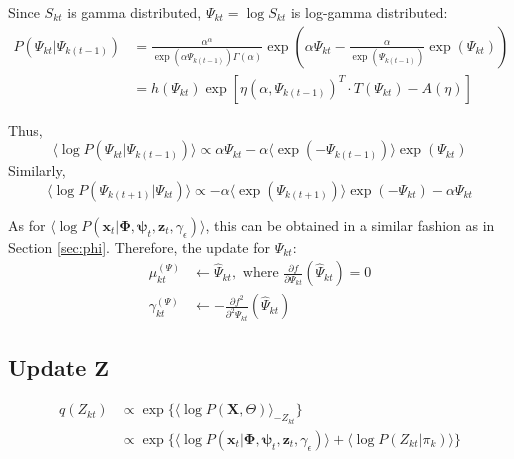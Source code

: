 \documentclass[11pt]{article} %
\begin{document}
Since $S_{kt}$ is gamma distributed, $\Psi_{kt} = \log S_{kt}$ is log-gamma distributed:
\begin{align*}
P(\Psi_{kt} | \Psi_{k(t-1)} ) &= \frac{\alpha^\alpha}{\exp(\alpha \Psi_{k(t-1)}) \Gamma(\alpha)} \exp(\alpha \Psi_{kt} - \frac{\alpha}{\exp(\Psi_{k(t-1)})} \exp(\Psi_{kt}))\\
&= h(\Psi_{kt}) \exp[\eta(\alpha, \Psi_{k(t-1)})^T \cdot T(\Psi_{kt}) - A(\eta)]
\end{align*}

Thus, 
\[
\langle \log P(\Psi_{kt} | \Psi_{k(t-1)}) \rangle \propto \alpha \Psi_{kt} - \alpha \langle \exp(-\Psi_{k(t-1)}) \rangle \exp(\Psi_{kt})
\]
Similarly,
\[
\langle \log P(\Psi_{k(t+1)} | \Psi_{kt}) \rangle \propto -\alpha \langle \exp(\Psi_{k(t+1)}) \rangle \exp(-\Psi_{kt}) - \alpha \Psi_{kt}
\]

As for $\langle \log P(\bm{x}_t | \mathbf{\Phi}, \bm{\psi}_t, \mathbf{z}_t, \gamma_\epsilon)\rangle$, this can be obtained in a similar fashion as in Section \ref{sec:phi}. Therefore, the update for $\Psi_{kt}$:
\begin{align*}
\mu_{kt}^{(\Psi)} &\leftarrow \hat{\Psi}_{kt}, \text{ where }  \frac{\partial f}{\partial \Psi_{kt}} (\hat{\Psi}_{kt}) = 0 \\
\gamma_{kt}^{(\Psi)} &\leftarrow -\frac{\partial f^2}{\partial^2 \Psi_{kt}} (\hat{\Psi}_{kt})
\end{align*}

\subsection{Update $\mathbf{Z}$}
\begin{align*}
q(Z_{kt}) &\propto \exp\{\langle\log P(\mathbf{X}, \Theta)\rangle_{-Z_{kt}}\}\\
&\propto \exp\{\langle \log P(\bm{x}_t | \mathbf{\Phi}, \bm{\psi}_t, \mathbf{z}_t, \gamma_\epsilon)\rangle + \langle \log P(Z_{kt} | \pi_k) \rangle \}
\end{align*}
\end{document}
